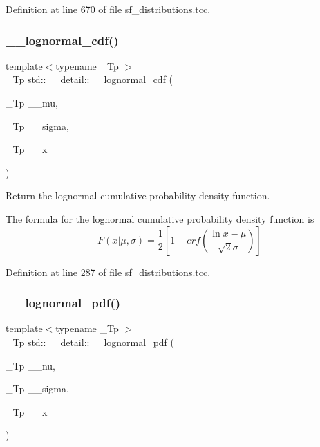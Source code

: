 Definition at line 670 of file sf\+\_\+distributions.\+tcc.

\mbox{\label{namespacestd_1_1____detail_a871cf2e541cc4f8a79e4d219c628edc4}} 
\subsubsection{\texorpdfstring{\+\_\+\+\_\+lognormal\+\_\+cdf()}{\_\_lognormal\_cdf()}}
{\footnotesize\ttfamily template$<$typename \+\_\+\+Tp $>$ \\
\+\_\+\+Tp std\+::\+\_\+\+\_\+detail\+::\+\_\+\+\_\+lognormal\+\_\+cdf (\begin{DoxyParamCaption}\item[{\+\_\+\+Tp}]{\+\_\+\+\_\+mu,  }\item[{\+\_\+\+Tp}]{\+\_\+\+\_\+sigma,  }\item[{\+\_\+\+Tp}]{\+\_\+\+\_\+x }\end{DoxyParamCaption})}



Return the lognormal cumulative probability density function. 

The formula for the lognormal cumulative probability density function is \[ F(x|\mu,\sigma) = \frac{1}{2}\left[ 1-erf(\frac{\ln{x}-\mu}{\sqrt{2}\sigma}) \right] \] 

Definition at line 287 of file sf\+\_\+distributions.\+tcc.

\mbox{\label{namespacestd_1_1____detail_a46c5dea7a38f38965bce5a84d389a02b}} 
\subsubsection{\texorpdfstring{\+\_\+\+\_\+lognormal\+\_\+pdf()}{\_\_lognormal\_pdf()}}
{\footnotesize\ttfamily template$<$typename \+\_\+\+Tp $>$ \\
\+\_\+\+Tp std\+::\+\_\+\+\_\+detail\+::\+\_\+\+\_\+lognormal\+\_\+pdf (\begin{DoxyParamCaption}\item[{\+\_\+\+Tp}]{\+\_\+\+\_\+nu,  }\item[{\+\_\+\+Tp}]{\+\_\+\+\_\+sigma,  }\item[{\+\_\+\+Tp}]{\+\_\+\+\_\+x }\end{DoxyParamCaption})}



